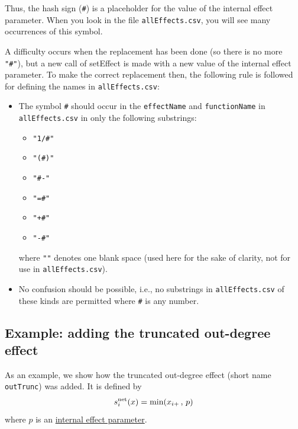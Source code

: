 \documentclass[a4paper,fleqn,11pt]{article}
\newcommand{\+}{\, + \,}
\newcommand{\sfn}[1]{\textsf{#1}}
\begin{document}
Thus, the hash sign  (\texttt{\#}) is a placeholder for the value of
the internal effect parameter.
When you look in the file \texttt{allEffects.csv}, you will see
many occurrences of this symbol.

A difficulty occurs when the replacement has been done
(so there is no more  \texttt{"\#"}), but a new
call of \sfn{setEffect} is made with a new value of the
internal effect parameter.
To make the correct replacement then, the following rule is followed
for defining the names in \texttt{allEffects.csv}:

\begin{itemize}
\item The symbol \texttt{\#} should occur in the \texttt{effectName}
and \texttt{functionName} in \texttt{allEffects.csv} in only the following substrings:
\begin{itemize}
  \item \texttt{"1/\#"}
  \item \texttt{"(\#)"}
  \item \texttt{"\#-"}
  \item \texttt{"={}\#"}
  \item \texttt{"+{}\#"}
  \item \texttt{"-{}\#"}
\end{itemize}
where \texttt{""} denotes one blank space (used here for the sake
of clarity, not for use in \texttt{allEffects.csv}).
\item No confusion should be possible, i.e.,
        no substrings in \texttt{allEffects.csv}
     of these kinds are permitted where \texttt{\#}  is any number.
\end{itemize}



\subsection{Example: adding the truncated out-degree effect}

As an example, we show how the truncated out-degree effect
(short name \texttt{outTrunc}) was added. It is
 defined by
 \begin{equation}
  s^{\rm net}_{i}(x) = \text{min}(x_{i+}\,,\, p)   \label{outTrunc}
 \end{equation}
where $p$ is an \hyperlink{T_effpar}{internal effect parameter}.
\end{document}
